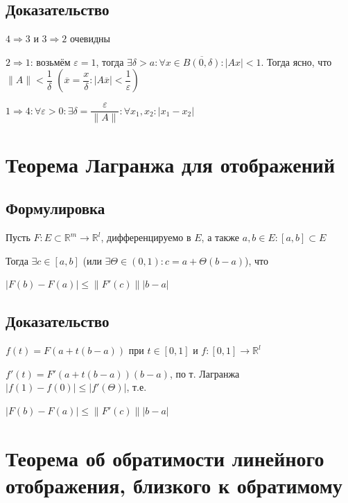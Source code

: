 \documentclass{article}
\begin{document}
        \subsection{Доказательство}
        
            $4 \Rightarrow 3$ и $3 \Rightarrow 2$ очевидны
            
            $2 \Rightarrow 1$: возьмём $\varepsilon = 1$, тогда $\exists \delta > a : \forall x \in \overline{B(0, \delta)} : |Ax| < 1$. Тогда ясно, что $\| A \| < \dfrac{1}{\delta}$ $\left( \overline{x} = \dfrac{x}{\delta} : |A \overline{x} | < \dfrac{1}{\varepsilon} \right)$
            
            $1 \Rightarrow 4 : \forall \varepsilon > 0 : \exists \delta = \dfrac{\varepsilon}{\| A \|} : \forall x_1, x_2 : |x_1 - x_2|$
            
    \newpage
    
    \section{Теорема Лагранжа для отображений}
    
        \subsection{Формулировка}
        
            Пусть $F : E \subset \mathbb{R}^m \rightarrow \mathbb{R}^l$, дифференцируемо в $E$, а также $a, b \in E : [a, b] \subset E$
            
            Тогда $\exists c \in [a, b]$ (или $\exists \Theta \in (0, 1) : c = a + \Theta (b - a)$), что
            
            $|F(b) - F(a)| \leq \| F'(c) \| |b - a|$
        
        \subsection{Доказательство}
        
            $f(t) = F(a + t(b - a))$ при $t \in [0, 1]$ и $f : [0, 1] \rightarrow \mathbb{R}^l$
            
            $f'(t) = F'(a + t(b - a)) (b - a)$, по т. Лагранжа $|f(1) - f(0)| \leq |f'(\Theta)|$, т.е.
            
            $|F(b) - F(a)| \leq \| F'(c) \| |b - a|$
            
    \newpage
    
    \section{Теорема об обратимости линейного отображения, близкого к обратимому}
    
\end{document}
